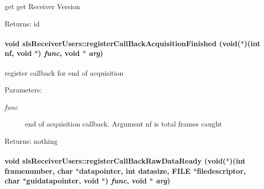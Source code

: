 get get Receiver Version \begin{Desc}
\item[Returns:]id \end{Desc}
\hypertarget{classslsReceiverUsers_7471d2945e8650eece86258e6ca56156}{
\paragraph[registerCallBackAcquisitionFinished]{\setlength{\rightskip}{0pt plus 5cm}void sls\-Receiver\-Users::register\-Call\-Back\-Acquisition\-Finished (void($\ast$)(int nf, void $\ast$) {\em func}, void $\ast$ {\em arg})}\hfill}
\label{classslsReceiverUsers_7471d2945e8650eece86258e6ca56156}


register callback for end of acquisition \begin{Desc}
\item[Parameters:]
\begin{description}
\item[{\em func}]end of acquisition callback. Argument nf is total frames caught \end{description}
\end{Desc}
\begin{Desc}
\item[Returns:]nothing \end{Desc}
\hypertarget{classslsReceiverUsers_343b9fac505e8c08a7fbf9efdd0f5762}{
\paragraph[registerCallBackRawDataReady]{\setlength{\rightskip}{0pt plus 5cm}void sls\-Receiver\-Users::register\-Call\-Back\-Raw\-Data\-Ready (void($\ast$)(int framenumber, char $\ast$datapointer, int datasize, FILE $\ast$filedescriptor, char $\ast$guidatapointer, void $\ast$) {\em func}, void $\ast$ {\em arg})}\hfill}
\label{classslsReceiverUsers_343b9fac505e8c08a7fbf9efdd0f5762}


